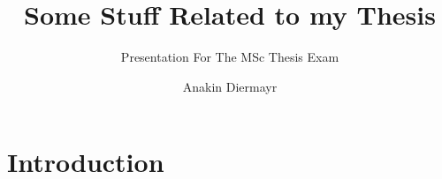 \documentclass[aspectratio=169, onlytextwidth,  notheorems, sOuRcEs, fleqn, leqno, ]{RUCPresentation}
\title{%
    Some Stuff Related to my Thesis
}
\subtitle{Presentation For The MSc Thesis Exam}
\author[Anakin]{Anakin Diermayr\inst{1}}%
\institute[RUC]{
    \inst{1} Roskilde University
}
\newcommand\makebeamertitle{\frame{\maketitle}}%
\begin{document}
\makebeamertitle


%
%

%
%


\section{Introduction}
\end{document}
